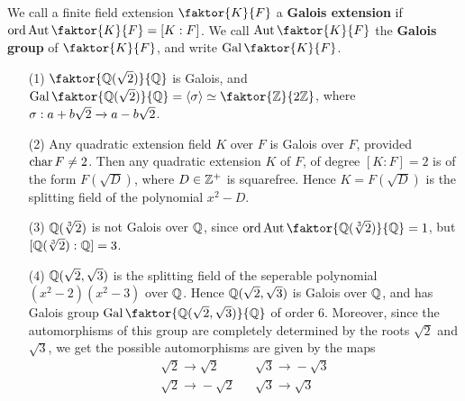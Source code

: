 \begin{definition}
    We call a finite field extension $\faktor{K}{F}$ a \textbf{Galois extension}
    if $\ord{\Aut{\faktor{K}{F}}}=[K:F]$. We call $\Aut{\faktor{K}{F}}$ the
    \textbf{Galois group} of $\faktor{K}{F}$, and write $\Gal{\faktor{K}{F}}$.
\end{definition}

\begin{example}\label{example_2.3}
    \begin{enumerate}
        \item[(1)] $\faktor{\Q(\sqrt{2})}{\Q}$ is Galois, and
            $\Gal{\faktor{\Q(\sqrt{2})}{\Q}}=\langle \s \rangle \simeq
            \faktor{\Z}{2\Z}$, where $\sigma:a+b\sqrt{2} \xrightarrow{}
            a-b\sqrt{2}$.

        \item[(2)] Any quadratic extension field $K$ over  $F$ is Galois over
            $F$, provided  $\operatorname{char}{F} \neq 2$. Then any quadratic extension $K$
            of  $F$, of degree  $[K:F]=2$ is of the form $F(\sqrt{D})$, where $D
            \in \mathbb{Z}^+$ is squarefree. Hence $K=F(\sqrt{D})$ is the splitting
            field of the polynomial $x^2-D$.

        \item[(3)] $\mathbb{Q}(\sqrt[3]{2})$ is not Galois over $\mathbb{Q}$, since
            $\ord{\Aut{\faktor{\Q(\sqrt[3]{2})}{\Q}}}=1$, but
            $[\mathbb{Q}(\sqrt[3]{2}):\mathbb{Q}]=3$.

        \item[(4)] $\mathbb{Q}(\sqrt{2},\sqrt{3})$ is the splitting field of the
            seperable polynomial $(x^2-2)(x^2-3)$ over $\mathbb{Q}$. Hence
            $\mathbb{Q}(\sqrt{2},\sqrt{3})$ is Galois over $\mathbb{Q}$, and has Galois group
            $\Gal{\faktor{\Q(\sqrt{2},\sqrt{3})}{\Q}}$ of order $6$. Moreover,
            since the automorphisms of this group are completely determined by
            the roots $\sqrt{2}$ and $\sqrt{3}$, we get the possible
            automorphisms are given by the maps
            \begin{equation*}
                \begin{array}{lcl}
                    \sqrt{2}    \xrightarrow{} \sqrt{2} && \sqrt{3}
                                                \xrightarrow{} -\sqrt{3} \\

                 \sqrt{2}    \xrightarrow{} -\sqrt{2} && \sqrt{3}
                                            \xrightarrow{} \sqrt{3} \\


\end{array}
\end{equation*}
\end{enumerate}
\end{example}
